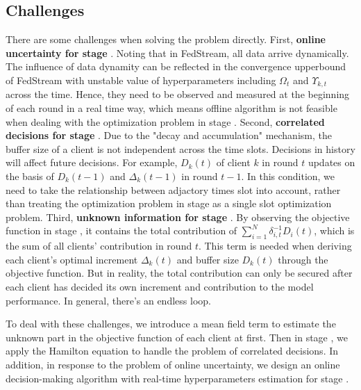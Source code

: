 \documentclass{article}
\theoremstyle{plain}
\theoremstyle{definition}
\theoremstyle{remark}
\begin{document}
\subsection{Challenges}
There are some challenges when solving the problem directly.
First, \textbf{online uncertainty for stage \uppercase\expandafter{}}. Noting that in FedStream, all data arrive dynamically. The influence of data dynamity can be reflected in the convergence upperbound of FedStream with unstable value of hyperparameters including $\Omega_t$ and $\Upsilon_{k,t}$ across the time.
Hence, they need to be observed and measured at the beginning of each round in a real time way, which means offline algorithm is not feasible when dealing with the optimization problem in stage \uppercase\expandafter{}.
Second, \textbf{correlated decisions for stage \uppercase\expandafter{}}. Due to the "decay and accumulation" mechanism, the buffer size of a client is not independent across the time slots. Decisions in history will affect future decisions. For example, $D_k(t)$ of client $k$ in round $t$ updates on the basis of $D_k(t-1)$ and $\Delta_k(t-1)$ in round $t - 1$.
In this condition, we need to take the relationship between adjactory times slot into account, rather than treating the optimization problem in stage \uppercase\expandafter{} as a single slot optimization problem.
Third, \textbf{unknown information for stage \uppercase\expandafter{}}. By observing the objective function in stage \uppercase\expandafter{}, it contains the total contribution of $\sum_{i=1}^{N}\delta_{i,t}^{-1}D_i(t)$, which is the sum of all clients' contribution in round $t$.
This term is needed when deriving each client's optimal increment $\Delta_k(t)$ and buffer size $D_k(t)$ through the objective function. But in reality, the total contribution can only be secured after each client has decided its own increment and contribution to the model performance.
In general, there's an endless loop.

To deal with these challenges, we introduce a mean field term to estimate the unknown part in the objective function of each client at first. 
Then in stage \uppercase\expandafter{}, we apply the Hamilton equation to handle the problem of correlated decisions.
In addition, in response to the problem of online uncertainty, we design an online decision-making algorithm with real-time hyperparameters estimation for stage \uppercase\expandafter{}.
\end{document}
